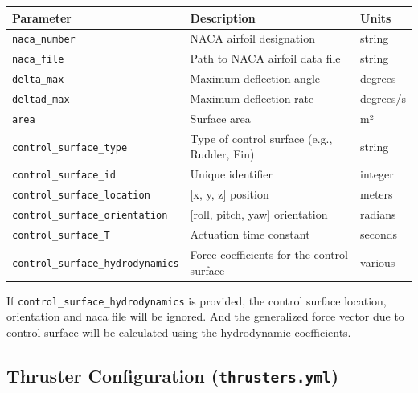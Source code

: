 \documentclass[
  letterpaper,
  DIV=11,
  numbers=noendperiod]{scrreprt}
\begin{document}
\begin{longtable}[]{@{}
  >{\raggedright\arraybackslash}p{}
  >{\raggedright\arraybackslash}p{}
  >{\raggedright\arraybackslash}p{}@{}}
\toprule\noalign{}
\begin{minipage}[b]{\linewidth}\raggedright
Parameter
\end{minipage} & \begin{minipage}[b]{\linewidth}\raggedright
Description
\end{minipage} & \begin{minipage}[b]{\linewidth}\raggedright
Units
\end{minipage} \\
\midrule\noalign{}
\endhead
\bottomrule\noalign{}
\endlastfoot
\texttt{naca\_number} & NACA airfoil designation & string \\
\texttt{naca\_file} & Path to NACA airfoil data file & string \\
\texttt{delta\_max} & Maximum deflection angle & degrees \\
\texttt{deltad\_max} & Maximum deflection rate & degrees/s \\
\texttt{area} & Surface area & m² \\
\texttt{control\_surface\_type} & Type of control surface (e.g., Rudder,
Fin) & string \\
\texttt{control\_surface\_id} & Unique identifier & integer \\
\texttt{control\_surface\_location} & {[}x, y, z{]} position & meters \\
\texttt{control\_surface\_orientation} & {[}roll, pitch, yaw{]}
orientation & radians \\
\texttt{control\_surface\_T} & Actuation time constant & seconds \\
\texttt{control\_surface\_hydrodynamics} & Force coefficients for the
control surface & various \\
\end{longtable}

If \texttt{control\_surface\_hydrodynamics} is provided, the control
surface location, orientation and naca file will be ignored. And the
generalized force vector due to control surface will be calculated using
the hydrodynamic coefficients.

\subsection*{\texorpdfstring{Thruster Configuration
(\texttt{thrusters.yml})}{Thruster Configuration (thrusters.yml)}}\label{thruster-configuration-thrusters.yml}
\end{document}
